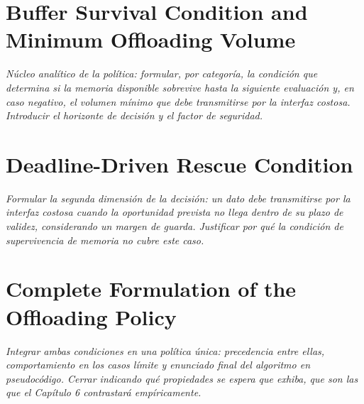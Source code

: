 \section{Buffer Survival Condition and Minimum Offloading Volume}
\emph{Núcleo analítico de la política: formular, por categoría, la condición que
determina si la memoria disponible sobrevive hasta la siguiente evaluación y, en
caso negativo, el volumen mínimo que debe transmitirse por la interfaz costosa.
Introducir el horizonte de decisión y el factor de seguridad.}

\section{Deadline-Driven Rescue Condition}
\emph{Formular la segunda dimensión de la decisión: un dato debe transmitirse por
la interfaz costosa cuando la oportunidad prevista no llega dentro de su plazo de
validez, considerando un margen de guarda. Justificar por qué la condición de
supervivencia de memoria no cubre este caso.}

\section{Complete Formulation of the Offloading Policy}
\emph{Integrar ambas condiciones en una política única: precedencia entre ellas,
comportamiento en los casos límite y enunciado final del algoritmo en
pseudocódigo. Cerrar indicando qué propiedades se espera que exhiba, que son las
que el Capítulo 6 contrastará empíricamente.}
